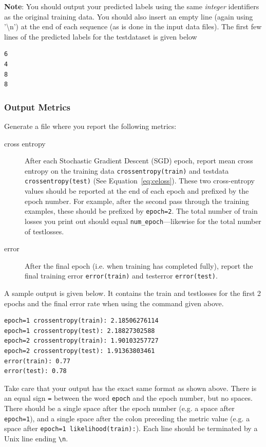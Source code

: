 \documentclass[11pt]{article}
\numberwithin{equation}{section} %
\numberwithin{figure}{section} %
\numberwithin{table}{section} %
\newcommand{\ntset}{test}
\begin{document}
\textbf{Note}: You should output your predicted labels using the same \emph{integer} identifiers as the original training data. You should also insert an empty line (again using ’\textbackslash n’) at the end of each sequence (as is done in the input data files). The first few lines of the predicted labels for the \ntset\thinspace dataset is given below
\\

\begin{lstlisting}
6
4
8
8
\end{lstlisting}


\subsubsection{Output Metrics} \label{metrics}
Generate a file where you report the following metrics: 

\begin{description}
\item[cross entropy] After each Stochastic Gradient Descent (SGD) epoch, report mean cross entropy on the training data \lstinline{crossentropy(train)} and \ntset\thinspace data \texttt{crossentropy(\ntset)} (See Equation~\ref{eq:celoss}). These two cross-entropy values should be reported at the end of each epoch and prefixed by the epoch number. For example, after the second pass through the training examples, these should be prefixed by \lstinline{epoch=2}. The total number of train losses you print out should equal \texttt{num\_epoch}---likewise for the total number of \ntset\thinspace losses.
\item[error] After the final epoch (i.e. when training has completed fully), report the final training error \lstinline{error(train)} and \ntset\thinspace error \texttt{error(\ntset)}. 
\end{description}

A sample output is given below. It contains the train and \ntset\thinspace losses for the first 2 epochs and the final error rate when using the command given above.

\begin{lstlisting}
epoch=1 crossentropy(train): 2.18506276114
epoch=1 crossentropy(test): 2.18827302588
epoch=2 crossentropy(train): 1.90103257727
epoch=2 crossentropy(test): 1.91363803461
error(train): 0.77
error(test): 0.78
\end{lstlisting}


Take care that your output has the exact same format as shown above. There is an equal sign \lstinline{=} between the word \lstinline{epoch} and the epoch number, but no spaces. There should be a single space after the epoch number (e.g. a space after \lstinline{epoch=1}), and a single space after the colon preceding the metric value (e.g. a space after \lstinline{epoch=1 likelihood(train):}). Each line should be terminated by a Unix line ending \lstinline{\n}.
\end{document}
